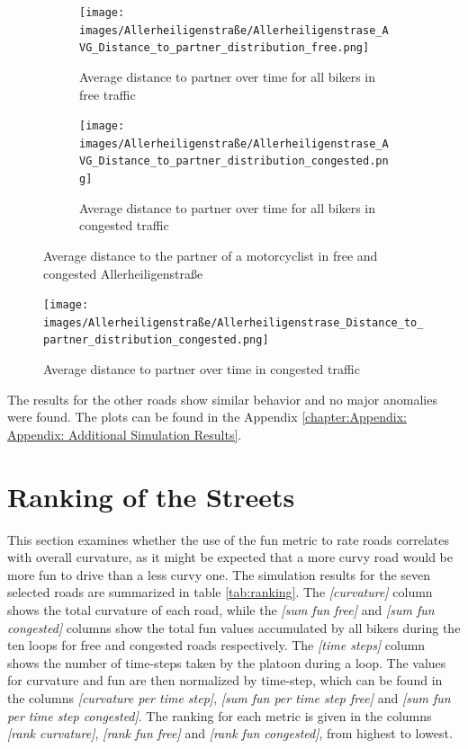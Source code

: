 \begin{figure}
     \centering
     \begin{subfigure}[b]{1.0\textwidth}
         \centering
         \texttt{[image: images/Allerheiligenstraße/Allerheiligenstrase\_AVG\_Distance\_to\_partner\_distribution\_free.png]}
         \caption{Average distance to partner over time for all bikers in free traffic}
     \end{subfigure}
     \hfill
     \begin{subfigure}[b]{1.0\textwidth}
         \centering
         \texttt{[image: images/Allerheiligenstraße/Allerheiligenstrase\_AVG\_Distance\_to\_partner\_distribution\_congested.png]}
         \caption{Average distance to partner over time for all bikers in congested traffic}
     \end{subfigure}
        \caption{Average distance to the partner of a motorcyclist in free and congested Allerheiligenstraße}
        \label{fig:Allerheiligenstraße_distance_partner}
\end{figure}

\begin{figure}
\texttt{[image: images/Allerheiligenstraße/Allerheiligenstrase\_Distance\_to\_partner\_distribution\_congested.png]}
\caption{Average distance to partner over time in congested traffic}
\label{fig:Allerheiligenstraß_distance_partner_separate}
\end{figure}

The results for the other roads show similar behavior and no major anomalies were found. The plots can be found in the Appendix \ref{chapter:Appendix: Appendix: Additional Simulation Results}.


\section{Ranking of the Streets}
\label{Ranking of the Streets}
This section examines whether the use of the fun metric to rate roads correlates with overall curvature, as it might be expected that a more curvy road would be more fun to drive than a less curvy one.  
The simulation results for the seven selected roads are summarized in table \ref{tab:ranking}. The \textit{[curvature]} column shows the total curvature of each road, while the \textit{[sum fun free]} and \textit{[sum fun congested]} columns show the total fun values accumulated by all bikers during the ten loops for free and congested roads respectively. The \textit{[time steps]} column shows the number of time-steps taken by the platoon during a loop. The values for curvature and fun are then normalized by time-step, which can be found in the columns \textit{[curvature per time step]}, \textit{[sum fun per time step free]} and \textit{[sum fun per time step congested]}. The ranking for each metric is given in the columns \textit{[rank curvature]}, \textit{[rank fun free]} and \textit{[rank fun congested]}, from highest to lowest.\\

